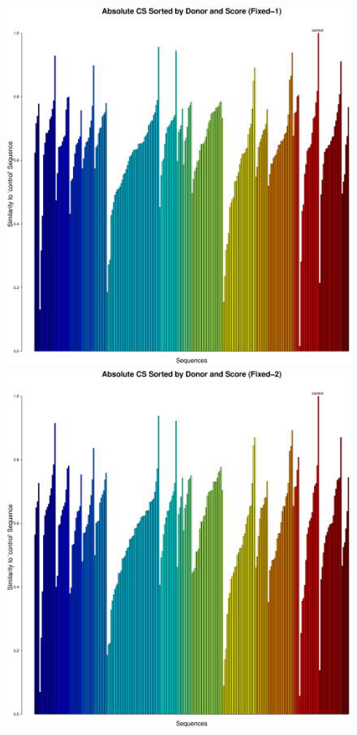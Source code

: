 \documentclass[conference]{IEEEtran}
\begin{document}
\begin{figure}
	\centering
	\includegraphics[width=0.8\linewidth]{ordered_by_Donor-Score_PC_Fixed-1}
	\includegraphics[width=0.8\linewidth]{ordered_by_Donor-Score_PC_Fixed-2}
\end{figure}
\end{document}
